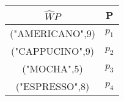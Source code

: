 \begin{tabular}{c|c}

$\widehat{W}P$  & P     \\ \hline
("AMERICANO",9) & $p_1$ \\ \hline
("CAPPUCINO",9) & $p_2$ \\ \hline
("MOCHA",5)     & $p_3$ \\ \hline
("ESPRESSO",8)  & $p_4$ \\ \hline
\end{tabular}
